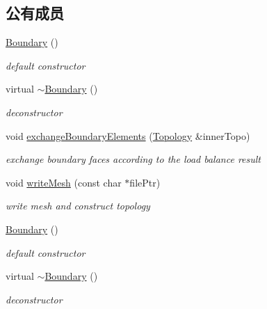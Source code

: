 \subsection*{公有成员}
\begin{DoxyCompactItemize}
\item 
\hyperlink{classHSF_1_1Boundary_a66741eb92598adf5e34a07568a0a8778}{Boundary} ()
\begin{DoxyCompactList}\small\item\em default constructor \item\end{DoxyCompactList}\item 
virtual \hyperlink{classHSF_1_1Boundary_a8249905be447e99edf81401f17093f5e}{$\sim$Boundary} ()
\begin{DoxyCompactList}\small\item\em deconstructor \item\end{DoxyCompactList}\item 
void \hyperlink{classHSF_1_1Boundary_a247677270031ff60c915e7afb1a1de51}{exchangeBoundaryElements} (\hyperlink{classHSF_1_1Topology}{Topology} \&innerTopo)
\begin{DoxyCompactList}\small\item\em exchange boundary faces according to the load balance result \item\end{DoxyCompactList}\item 
void \hyperlink{classHSF_1_1Boundary_aa9891dd719196ca7307e0327d1eaf39f}{writeMesh} (const char $\ast$filePtr)
\begin{DoxyCompactList}\small\item\em write mesh and construct topology \item\end{DoxyCompactList}\item 
\hyperlink{classHSF_1_1Boundary_a66741eb92598adf5e34a07568a0a8778}{Boundary} ()
\begin{DoxyCompactList}\small\item\em default constructor \item\end{DoxyCompactList}\item 
virtual \hyperlink{classHSF_1_1Boundary_a8249905be447e99edf81401f17093f5e}{$\sim$Boundary} ()
\begin{DoxyCompactList}\small\item\em deconstructor \item\end{DoxyCompactList}\item 

\end{DoxyCompactItemize}
